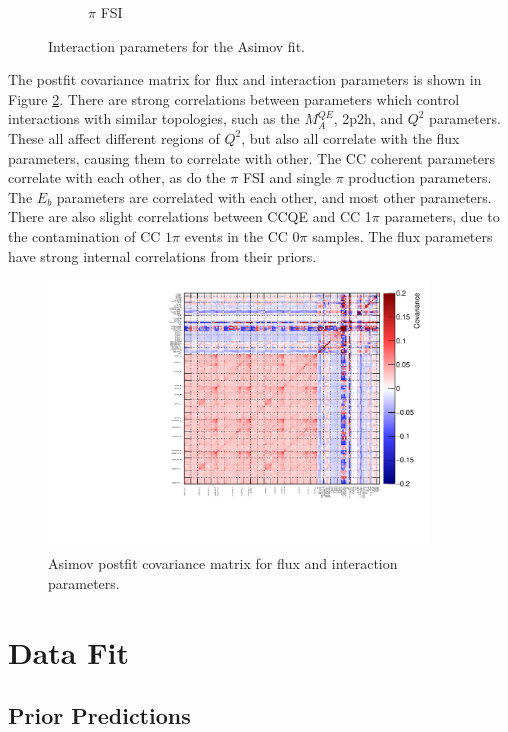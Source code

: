 \begin{figure}
\begin{subfigure}{0.49\textwidth}
  \caption{$\pi$ FSI}
\end{subfigure}
\caption{Interaction parameters for the Asimov fit.}
\label{fig:asmvxsec}
\end{figure}

The postfit covariance matrix for flux and interaction parameters is shown in Figure \ref{fig:asmvpostfitcov}. There are strong correlations between parameters which control interactions with similar topologies, such as the $M^{QE}_A$, 2p2h, and $Q^2$ parameters. These all affect different regions of $Q^2$, but also all correlate with the flux parameters, causing them to correlate with other. The CC coherent parameters correlate with each other, as do the $\pi$ FSI and single $\pi$ production parameters. The $E_b$ parameters are correlated with each other, and most other parameters. There are also slight correlations between CCQE and CC 1$\pi$ parameters, due to the contamination of CC $1\pi$ events in the CC 0$\pi$ samples. The flux parameters have strong internal correlations from their priors.

\begin{figure}
\centering
\includegraphics*[width=0.9\textwidth,clip]{figs/asmvpostfitcov}
\caption{Asimov postfit covariance matrix for flux and interaction parameters.}\label{fig:asmvpostfitcov}
\end{figure}

\section{Data Fit}\label{sec:datafit}

\subsection{Prior Predictions}

